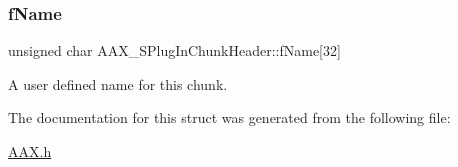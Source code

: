 \subsubsection{\texorpdfstring{fName}{fName}}
{\footnotesize\ttfamily unsigned char A\+A\+X\+\_\+\+S\+Plug\+In\+Chunk\+Header\+::f\+Name\mbox{[}32\mbox{]}}



A user defined name for this chunk. 



The documentation for this struct was generated from the following file\+:\begin{DoxyCompactItemize}
\item 
\mbox{\hyperlink{a00392}{A\+A\+X.\+h}}\end{DoxyCompactItemize}
